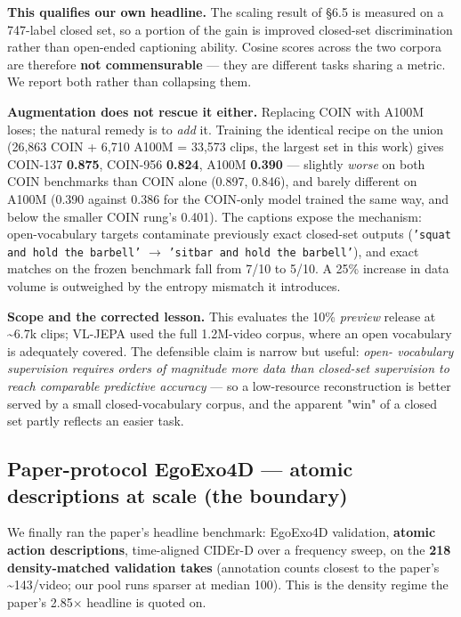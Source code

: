 \textbf{This qualifies our own headline.} The scaling result of \S6.5 is measured on a 747-label closed set, so a portion of the gain is improved closed-set discrimination rather than open-ended captioning ability. Cosine scores across the two corpora are therefore \textbf{not commensurable} --- they are different tasks sharing a metric. We report both rather than collapsing them.

\textbf{Augmentation does not rescue it either.} Replacing COIN with A100M loses; the natural remedy is to \emph{add} it. Training the identical recipe on the union (26,863 COIN + 6,710 A100M = 33,573 clips, the largest set in this work) gives COIN-137 \textbf{0.875}, COIN-956 \textbf{0.824}, A100M \textbf{0.390} --- slightly \emph{worse} on both COIN benchmarks than COIN alone (0.897, 0.846), and barely different on A100M (0.390 against 0.386 for the COIN-only model trained the same way, and below the smaller COIN rung's 0.401). The captions expose the mechanism: open-vocabulary targets contaminate previously exact closed-set outputs (\texttt{'squat and hold the barbell'} $\rightarrow$ \texttt{'sitbar and hold the barbell'}), and exact matches on the frozen benchmark fall from 7/10 to 5/10. A 25\% increase in data volume is outweighed by the entropy mismatch it introduces.

\textbf{Scope and the corrected lesson.} This evaluates the 10\% \emph{preview} release at \textasciitilde{}6.7k clips; VL-JEPA used the full 1.2M-video corpus, where an open vocabulary is adequately covered. The defensible claim is narrow but useful: \emph{open- vocabulary supervision requires orders of magnitude more data than closed-set supervision to reach comparable predictive accuracy} --- so a low-resource reconstruction is better served by a small closed-vocabulary corpus, and the apparent "win" of a closed set partly reflects an easier task.

\subsection{Paper-protocol EgoExo4D --- atomic descriptions at scale (the boundary)}

We finally ran the paper's headline benchmark: EgoExo4D validation, \textbf{atomic action descriptions}, time-aligned CIDEr-D over a frequency sweep, on the \textbf{218 density-matched validation takes} (annotation counts closest to the paper's \textasciitilde{}143/video; our pool runs sparser at median 100). This is the density regime the paper's 2.85$\times$ headline is quoted on.

